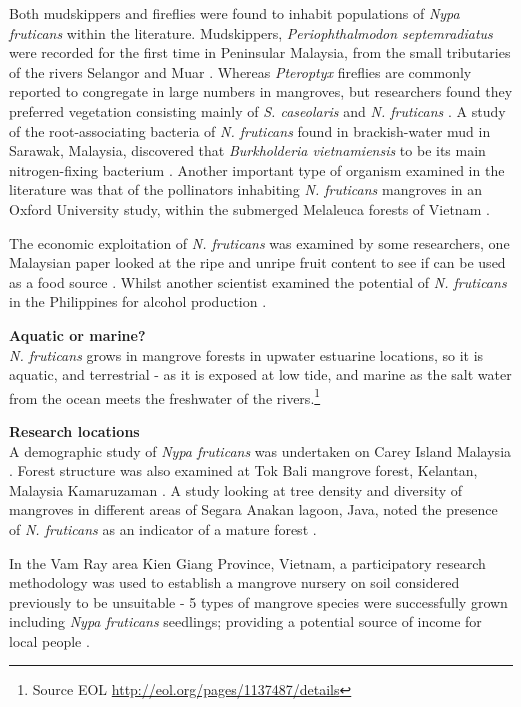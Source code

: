 \documentclass[]{book}
\let\rmarkdownfootnote\footnote%
\def\footnote{\protect\rmarkdownfootnote}
\theoremstyle{definition}
\theoremstyle{definition}
\theoremstyle{definition}
\theoremstyle{remark}
\begin{document}
Both mudskippers and fireflies were found to inhabit populations of
\emph{Nypa fruticans} within the literature. Mudskippers,
\emph{Periophthalmodon septemradiatus} were recorded for the first time
in Peninsular Malaysia, from the small tributaries of the rivers
Selangor and Muar \citep{Khaironizam_2003}. Whereas \emph{Pteroptyx}
fireflies are commonly reported to congregate in large numbers in
mangroves, but researchers found they preferred vegetation consisting
mainly of \emph{S. caseolaris} and \emph{N. fruticans}
\citep{Jusoh_2010}. A study of the root-associating bacteria of \emph{N.
fruticans} found in brackish-water mud in Sarawak, Malaysia, discovered
that \emph{Burkholderia vietnamiensis} to be its main nitrogen-fixing
bacterium \citep{Tang_2010}. Another important type of organism examined
in the literature was that of the pollinators inhabiting \emph{N.
fruticans} mangroves in an Oxford University study, within the submerged
Melaleuca forests of Vietnam \citep{Quang_Tan_2008}.

The economic exploitation of \emph{N. fruticans} was examined by some
researchers, one Malaysian paper looked at the ripe and unripe fruit
content to see if can be used as a food source \citep{Chau_Sum_2013}.
Whilst another scientist examined the potential of \emph{N. fruticans}
in the Philippines for alcohol production \citep{Rasco_2010}.

\textbf{Aquatic or marine?}\\
\emph{N. fruticans} grows in mangrove forests in upwater estuarine
locations, so it is aquatic, and terrestrial - as it is exposed at low
tide, and marine as the salt water from the ocean meets the freshwater
of the rivers.\footnote{Source EOL
  \url{http://eol.org/pages/1137487/details}}

\textbf{Research locations}\\
A demographic study of \emph{Nypa fruticans} was undertaken on Carey
Island Malaysia \citep{Aslezaeim_2010}. Forest structure was also
examined at Tok Bali mangrove forest, Kelantan, Malaysia Kamaruzaman
\citep{Kamaruzaman_2007}. A study looking at tree density and diversity
of mangroves in different areas of Segara Anakan lagoon, Java, noted the
presence of \emph{N. fruticans} as an indicator of a mature forest
\citep{Hinrichs_2008}.

In the Vam Ray area Kien Giang Province, Vietnam, a participatory
research methodology was used to establish a mangrove nursery on soil
considered previously to be unsuitable - 5 types of mangrove species
were successfully grown including \emph{Nypa fruticans} seedlings;
providing a potential source of income for local people
\citep{Nguyen_2016}.
\end{document}
